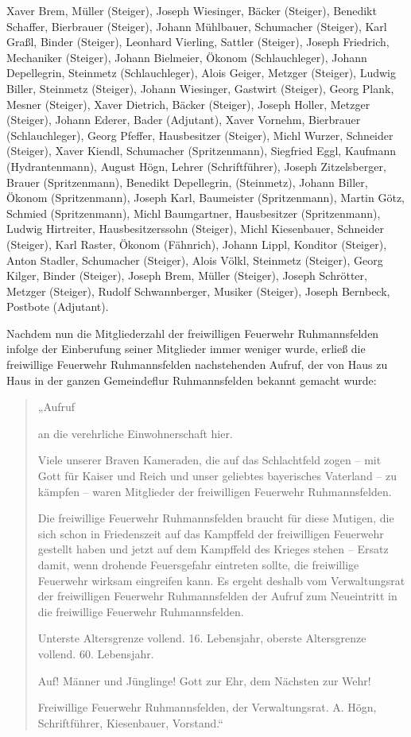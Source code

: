 \documentclass[12pt,a4paper]{book}
\begin{document}
Xaver Brem, Müller (Steiger), Joseph Wiesinger, Bäcker (Steiger), Benedikt
Schaffer, Bierbrauer (Steiger), Johann Mühlbauer, Schumacher (Steiger), Karl
Graßl, Binder (Steiger), Leonhard Vierling, Sattler (Steiger), Joseph Friedrich,
Mechaniker (Steiger), Johann Bielmeier, Ökonom (Schlauchleger), Johann
Depellegrin, Steinmetz (Schlauchleger), Alois Geiger, Metzger (Steiger), Ludwig
Biller, Steinmetz (Steiger), Johann Wiesinger, Gastwirt (Steiger), Georg Plank,
Mesner (Steiger), Xaver Dietrich, Bäcker (Steiger), Joseph Holler, Metzger
(Steiger), Johann Ederer, Bader (Adjutant), Xaver Vornehm, Bierbrauer
(Schlauchleger), Georg Pfeffer, Hausbesitzer (Steiger), Michl Wurzer, Schneider
(Steiger), Xaver Kiendl, Schumacher (Spritzenmann), Siegfried Eggl, Kaufmann
(Hydrantenmann), August Högn, Lehrer (Schriftführer), Joseph Zitzelsberger,
Brauer (Spritzenmann), Benedikt Depellegrin, (Steinmetz), Johann Biller, Ökonom
(Spritzenmann), Joseph Karl, Baumeister (Spritzenmann), Martin Götz, Schmied
(Spritzenmann), Michl Baumgartner, Hausbesitzer (Spritzenmann), Ludwig
Hirtreiter, Hausbesitzerssohn (Steiger), Michl Kiesenbauer, Schneider (Steiger),
Karl Raster, Ökonom (Fähnrich), Johann Lippl, Konditor (Steiger), Anton Stadler,
Schumacher (Steiger), Alois Völkl, Steinmetz (Steiger), Georg Kilger, Binder
(Steiger), Joseph Brem, Müller (Steiger), Joseph Schrötter, Metzger (Steiger),
Rudolf Schwannberger, Musiker (Steiger), Joseph Bernbeck, Postbote (Adjutant).

Nachdem nun die Mitgliederzahl der freiwilligen Feuerwehr Ruhmannsfelden infolge
der Einberufung seiner Mitglieder immer weniger wurde, erließ die freiwillige
Feuerwehr Ruhmannsfelden nachstehenden Aufruf, der von Haus zu Haus in der
ganzen Gemeindeflur Ruhmannsfelden bekannt gemacht wurde:

\begin{quote}
„Aufruf

an die verehrliche Einwohnerschaft hier.

Viele unserer Braven Kameraden, die auf das Schlachtfeld zogen – mit Gott für
Kaiser und Reich und unser geliebtes bayerisches Vaterland – zu kämpfen – waren
Mitglieder der freiwilligen Feuerwehr Ruhmannsfelden.

Die freiwillige Feuerwehr Ruhmannsfelden braucht für diese Mutigen, die sich
schon in Friedenszeit auf das Kampffeld der freiwilligen Feuerwehr gestellt
haben und jetzt auf dem Kampffeld des Krieges stehen – Ersatz damit, wenn
drohende Feuersgefahr eintreten sollte, die freiwillige Feuerwehr wirksam
eingreifen kann. Es ergeht deshalb vom Verwaltungsrat der freiwilligen Feuerwehr
Ruhmannsfelden der Aufruf zum Neueintritt in die freiwillige Feuerwehr
Ruhmannsfelden.

Unterste Altersgrenze vollend. 16. Lebensjahr, oberste Altersgrenze vollend. 60.
Lebensjahr.

Auf! Männer und Jünglinge! Gott zur Ehr, dem Nächsten zur Wehr!

Freiwillige Feuerwehr Ruhmannsfelden, der Verwaltungsrat. A. Högn,
Schriftführer, Kiesenbauer, Vorstand.“
\end{quote}
\end{document}
